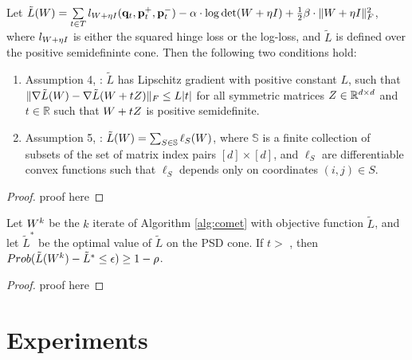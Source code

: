 \documentclass{article}
\begin{document}
\begin{theorem}
Let $\tilde{L}({W})=\sum\limits_{t\in T}{l_{{W} + \eta I}(\mathbf{q}_t, \mathbf{p}_{t}^{+}, \mathbf{p}_{t}^{-})} - \alpha \cdot \log \det({W} + \eta I) + \tfrac{1}{2} \beta \cdot \| {W} + \eta I \|_{F}^{2}$, where $l_{{W} + \eta I}$ is either the squared hinge loss or the log-loss, and $\tilde{L}$ is defined over the positive semidefininte cone.
Then the following two conditions hold:
\begin{enumerate}
\item Assumption 4, \citet{richtarik2013optimal}: $\tilde{L}$ has Lipschitz gradient with positive constant $L$, such that $\| \nabla \tilde{L}({W}) - \nabla \tilde{L}({W} + t{Z}) \|_F \leq L |t|$ for all symmetric matrices ${Z} \in \mathbb{R}^{d \times d}$ and $t \in \mathbb{R}$ such that ${W} + t{Z}$ is positive semidefinite.
\item Assumption 5, \citet{richtarik2013optimal}: 
$\tilde{L}({W}) = \sum_{S \in \mathbb{S}} \ell_S ({W})$, where $\mathbb{S}$ is a finite collection of subsets of the set of matrix index pairs $[d] \times [d]$, and $\ell_S$ are differentiable convex functions such that $\ell_S$ depends only on coordinates $(i,j) \in S$.
\end{enumerate}
\end{theorem}

\begin{proof}
proof here
\end{proof}

\begin{corollary}
Let ${W}^k$ be the $k$ iterate of Algorithm \ref{alg:comet} with objective function $\tilde{L}$, and let $\tilde{L}^*$ be the optimal value of $\tilde{L}$ on the PSD cone.
If $t >$ , then $Prob(\tilde{L}({W}^k) - \tilde{L}^* \leq \epsilon) \geq 1-\rho$.
\end{corollary}
\begin{proof}
proof here
\end{proof}
\section{Experiments}
\end{document}
